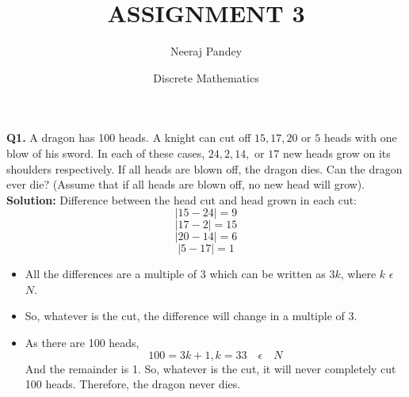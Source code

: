 \documentclass{article}
\title{ASSIGNMENT 3}
\author{Neeraj Pandey}
\date{Discrete Mathematics}
\begin{document}
\maketitle
\begin{flushleft}
\textbf{Q1. } A dragon has 100 heads. A knight can cut off $15, 17, 20$ or $5$ heads with one blow of his sword. In each of these cases, $24, 2, 14,$ or $17$ new heads grow on its shoulders respectively. If all heads are blown off, the dragon dies. Can the dragon ever die? (Assume that if all heads are blown off, no new head will
grow).
\newline
\newline
\textbf{Solution: } Difference between the head cut and head grown in each cut: \\
\[ \mid 15 - 24 \mid = 9\]
\[ \mid 17 - 2 \mid = 15\]
\[ \mid 20 - 14 \mid = 6\]
\[ \mid 5 - 17 \mid = 1\]
\newline
\begin{itemize}
  \item All the differences are a multiple of $3$ which can be written as $3k$, where $k$ $\epsilon$ $N$.
  \item So, whatever is the cut, the difference will change in a multiple of $3$.
  \item As there are 100 heads,
  \[100 = 3k + 1, k = 33 \quad \epsilon \quad N \]
  And the remainder is 1. So, whatever is the cut, it will never completely cut 100 heads. Therefore, the dragon never dies.
 
\end{itemize}
\end{flushleft}
\newpage
\end{document}
